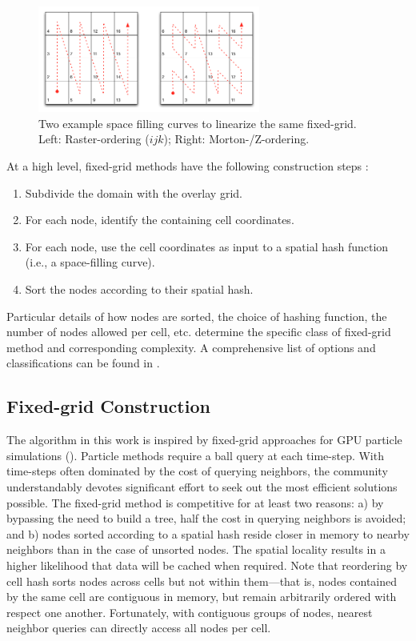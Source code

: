 \documentclass{report}
\begin{document}
\begin{figure}
\centering
\includegraphics[width=0.65\textwidth]{rbffd_methods_content/neighbors/space_filling_curves.png}
\caption{Two example space filling curves to linearize the same fixed-grid. Left: Raster-ordering ($ijk$); Right: Morton-/Z-ordering.}
\label{fig:space_filling_curves}
\end{figure} 


At a high level, fixed-grid methods have the following construction steps \cite{Krog2010}:
\begin{enumerate}
\item Subdivide the domain with the overlay grid.
\item For each node, identify the containing cell coordinates.
\item For each node, use the cell coordinates as input to a spatial hash function (i.e., a space-filling curve).
\item Sort the nodes according to their spatial hash.
\end{enumerate}
Particular details of how nodes are sorted, the choice of hashing function, the number of nodes allowed per cell, etc. determine the specific class of fixed-grid method and corresponding complexity. A comprehensive list of options and classifications can be found in \cite{Samet2005}. 

\subsection{Fixed-grid Construction}
The algorithm in this work is inspired by fixed-grid approaches for GPU particle simulations (\cite{Krog2010,Green2010,Johnson2011}). Particle methods require a ball query at each time-step. With time-steps often dominated by the cost of querying neighbors, the community understandably devotes significant effort to seek out the most efficient solutions possible. The fixed-grid method is competitive for at least two reasons: a) by bypassing the need to build a tree, half the cost in querying neighbors is avoided; and b) nodes sorted according to a spatial hash reside closer in memory to nearby neighbors than in the case of unsorted nodes. The spatial locality results in a higher likelihood that data will be cached when required. Note that reordering by cell hash sorts nodes across cells but not within them---that is, nodes contained by the same cell are contiguous in memory, but remain arbitrarily ordered with respect one another. Fortunately, with contiguous groups of nodes, nearest neighbor queries can directly access all nodes per cell. 
\end{document}
